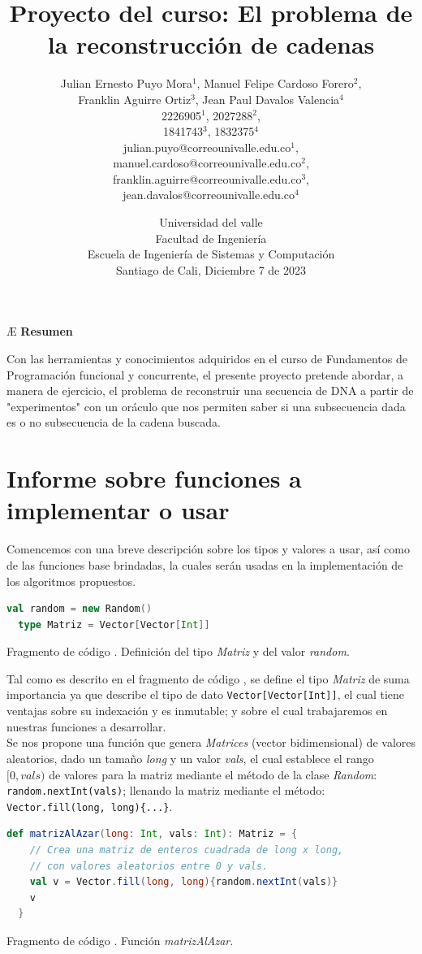 \documentclass{article}
\title{\textbf{Proyecto del curso: El problema de la reconstrucción de cadenas}}
\author{Julian Ernesto Puyo Mora$^1$,
        Manuel Felipe Cardoso Forero$^2$,\\
        Franklin Aguirre Ortiz$^3$,
        Jean Paul Davalos Valencia$^4$\\        
        2226905$^1$, 2027288$^2$,\\
        1841743$^3$, 1832375$^4$\\
        julian.puyo@correounivalle.edu.co$^1$,\\ 
        manuel.cardoso@correounivalle.edu.co$^2$,\\
        franklin.aguirre@correounivalle.edu.co$^3$,\\
        jean.davalos@correounivalle.edu.co$^4$\\}
\date{Universidad del valle\\ Facultad de Ingeniería\\ Escuela de Ingeniería de Sistemas y Computación\\
Santiago de Cali, Diciembre 7 de 2023}
\newcounter{codesnippet}
\newcommand{\newcodesnippet}{%
  \stepcounter{codesnippet}%
}
\begin{document}
\maketitle

\begin{center}Æ
{\bf \large Resumen}\\
\end{center}

Con las herramientas y conocimientos adquiridos en el curso de Fundamentos de Programación funcional y concurrente, el presente proyecto pretende abordar, a manera de ejercicio, el problema de reconstruir una secuencia de DNA a partir de "experimentos" con un oráculo que nos permiten saber si una subsecuencia dada es o no subsecuencia de la cadena buscada.

\section{Informe sobre funciones a implementar o usar}

Comencemos con una breve descripción sobre los tipos y valores a usar, así como de las funciones base brindadas, la cuales serán usadas en la implementación de los algoritmos propuestos.

\newcodesnippet
\begin{lstlisting}[language=Scala]
  val random = new Random()
  type Matriz = Vector[Vector[Int]]
\end{lstlisting}
\begin{center}
    \small{Fragmento de código \thecodesnippet. Definición del tipo \textit{Matriz} y del valor \textit{random}.}
\end{center}

Tal como es descrito en el fragmento de código \thecodesnippet, se define el tipo \textit{Matriz} de suma importancia ya que describe el tipo de dato \verb|Vector[Vector[Int]]|, el cual tiene ventajas sobre su indexación y es inmutable; y sobre el cual trabajaremos en nuestras funciones a desarrollar. \\

Se nos propone una función que genera \textit{Matrices} (vector bidimensional) de valores aleatorios, dado un tamaño \textit{long} y un valor \textit{vals}, el cual establece el rango \([0,vals)\) de valores para la matriz mediante el método de la clase \textit{Random}: \verb|random.nextInt(vals)|; llenando la matriz mediante el método: \verb|Vector.fill(long, long){...}|.

\newcodesnippet
\begin{lstlisting}[language=Scala]
  def matrizAlAzar(long: Int, vals: Int): Matriz = {
    // Crea una matriz de enteros cuadrada de long x long,
    // con valores aleatorios entre 0 y vals.
    val v = Vector.fill(long, long){random.nextInt(vals)}
    v
  }
\end{lstlisting}
\begin{center}
    \small{Fragmento de código \thecodesnippet. Función \textit{matrizAlAzar}.}
\end{center}
\end{document}
